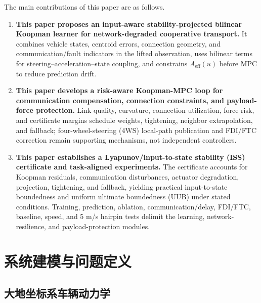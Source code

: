 \documentclass[twocolumn,3p,times,procedia]{elsarticle}
\begin{document}
The main contributions of this paper are as follows.
\begin{enumerate}
\item \textbf{This paper proposes an input-aware stability-projected bilinear Koopman learner for network-degraded cooperative transport.} It combines vehicle states, centroid errors, connection geometry, and communication/fault indicators in the lifted observation, uses bilinear terms for steering--acceleration--state coupling, and constrains $A_{\mathrm{eff}}(u)$ before MPC to reduce prediction drift.
\item \textbf{This paper develops a risk-aware Koopman-MPC loop for communication compensation, connection constraints, and payload-force protection.} Link quality, curvature, connection utilization, force risk, and certificate margins schedule weights, tightening, neighbor extrapolation, and fallback; four-wheel-steering (4WS) local-path publication and FDI/FTC correction remain supporting mechanisms, not independent controllers.
\item \textbf{This paper establishes a Lyapunov/input-to-state stability (ISS) certificate and task-aligned experiments.} The certificate accounts for Koopman residuals, communication disturbances, actuator degradation, projection, tightening, and fallback, yielding practical input-to-state boundedness and uniform ultimate boundedness (UUB) under stated conditions. Training, prediction, ablation, communication/delay, FDI/FTC, baseline, speed, and 5 m/s hairpin tests delimit the learning, network-resilience, and payload-protection modules.
\end{enumerate}

\section{系统建模与问题定义}

\subsection{大地坐标系车辆动力学}
\end{document}
